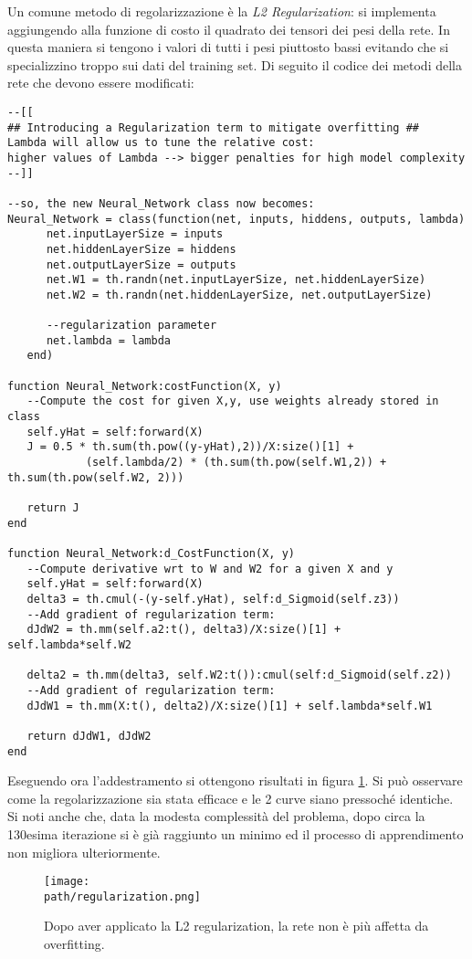 Un comune metodo di regolarizzazione è la \emph{L2 Regularization}: si implementa aggiungendo alla funzione di costo il quadrato dei tensori dei pesi della rete. In questa maniera si tengono i valori di tutti i pesi piuttosto bassi evitando che si specializzino troppo sui dati del training set. Di seguito il codice dei metodi della rete che devono essere modificati:  
\begin{lstlisting}[language={[5.2]Lua}]
--[[
## Introducing a Regularization term to mitigate overfitting ## 
Lambda will allow us to tune the relative cost: 
higher values of Lambda --> bigger penalties for high model complexity 
--]]

--so, the new Neural_Network class now becomes:
Neural_Network = class(function(net, inputs, hiddens, outputs, lambda)
      net.inputLayerSize = inputs
      net.hiddenLayerSize = hiddens
      net.outputLayerSize = outputs
      net.W1 = th.randn(net.inputLayerSize, net.hiddenLayerSize)
      net.W2 = th.randn(net.hiddenLayerSize, net.outputLayerSize)

      --regularization parameter
      net.lambda = lambda
   end)

function Neural_Network:costFunction(X, y)
   --Compute the cost for given X,y, use weights already stored in class
   self.yHat = self:forward(X)
   J = 0.5 * th.sum(th.pow((y-yHat),2))/X:size()[1] + 
            (self.lambda/2) * (th.sum(th.pow(self.W1,2)) + th.sum(th.pow(self.W2, 2)))

   return J
end

function Neural_Network:d_CostFunction(X, y)
   --Compute derivative wrt to W and W2 for a given X and y
   self.yHat = self:forward(X)
   delta3 = th.cmul(-(y-self.yHat), self:d_Sigmoid(self.z3))
   --Add gradient of regularization term:
   dJdW2 = th.mm(self.a2:t(), delta3)/X:size()[1] + self.lambda*self.W2

   delta2 = th.mm(delta3, self.W2:t()):cmul(self:d_Sigmoid(self.z2))
   --Add gradient of regularization term:
   dJdW1 = th.mm(X:t(), delta2)/X:size()[1] + self.lambda*self.W1

   return dJdW1, dJdW2
end
\end{lstlisting}
\linebreak
Eseguendo ora l'addestramento si ottengono risultati in figura \ref{fig:reg-plot}. Si può osservare come la regolarizzazione sia stata efficace e le 2 curve siano pressoché identiche. Si noti anche che, data la modesta complessità del problema, dopo circa la 130esima iterazione si è già raggiunto un minimo ed il processo di apprendimento non migliora ulteriormente. 
\begin{figure}[h!]
 \centering
 \texttt{[image: \\path/regularization.png]}
 \caption{Dopo aver applicato la L2 regularization, la rete non è più affetta da overfitting.}
 \label{fig:reg-plot}
\end{figure}

